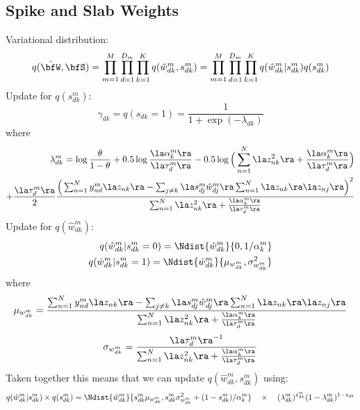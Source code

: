 \documentclass[10pt, a4paper,openany]{report}
\begin{document}
\subsection*{Spike and Slab Weights}
Variational distribution:
\[
q(\hat{\bfW},\bfS) = \prod_{m=1}^{M} \prod_{d=1}^{D_m} \prod_{k=1}^{K} q(\hat{w}_{dk}^m,s_{dk}^m) = \prod_{m=1}^{M} \prod_{d=1}^{D_m} \prod_{k=1}^{K} q(\hat{w}_{dk}^m|s_{dk}^m)q(s_{dk}^m)
\]
Update for $q(s_{dk}^m)$:
\[
\gamma_{dk} = q(s_{dk}=1) = \frac{1}{1+\exp(-\lambda_{dk})}
\]
where
\begin{align*}
\lambda_{dk}^m = \log\frac{\theta}{1-\theta} + 0.5\log\frac{\la\alpha_k^m\ra}{\la\tau_d^m\ra} - 0.5\log\Big( \sum_{n=1}^{N} \la z_{nk}^2 \ra + \frac{\la\alpha_k^m\ra}{\la\tau_d^m\ra} \Big) \\
+ \frac{\la\tau_d^m\ra}{2} \frac{ \Big( \sum_{n=1}^{N} y_{nd}^m \la z_{nk} \ra - \sum_{j \neq k} \la s_{dj}^m\hat{w}_{dj}^m\ra \sum_{n=1}^{N} \la z_{nk} \ra \la z_{nj} \ra \Big)^2} {\sum_{n=1}^{N} \la z_{nk}^2 \ra + \frac{\la\alpha_k^m\ra}{\la\tau_d^m\ra} }
\end{align*}
Update for $q(\hat{w}_{dk}^m)$:
\begin{align*}
q(\hat{w}_{dk}^m|s_{dk}^m=0) = \Ndist{\hat{w}_{dk}^m}{0,1/\alpha_k^m} \\
q(\hat{w}_{dk}^m|s_{dk}^m=1) = \Ndist{\hat{w}_{dk}^m}{\mu_{w_{dk}^m},\sigma_{w_{dk}^m}^2}
\end{align*}
where
\[
\mu_{w_{dk}^m} = \frac{ \sum_{n=1}^{N} y_{nd}^m \la z_{nk} \ra - \sum_{j \neq k} \la s_{dj}^m\hat{w}_{dj}^m \ra \sum_{n=1}^{N} \la z_{nk} \ra \la z_{nj} \ra } { \sum_{n=1}^{N} \la z_{nk}^2 \ra + \frac{\la\alpha_k^m\ra}{\la\tau_d^m\ra} }
\]
\[
\sigma_{w_{dk}^m} = \frac{ \la\tau_d^m\ra^{-1} } { \sum_{n=1}^{N} \la z_{nk}^2 \ra + \frac{\la\alpha_k^m\ra}{\la\tau_d^m\ra} }
\]
Taken together this means that we can update $q(\hat{w}_{dk}^m,s_{dk}^m)$ using:
\[
q(\hat{w}_{dk}^m|s_{dk}^m) \times q(s_{dk}^m) = \Ndist{ \hat{w}_{dk}^m } { s_{dk}^m \mu_{w_{dk}^m}, s_{dk}^m\sigma_{w_{dk}^m}^2 + (1-s_{dk}^m)/\alpha_k^m} \quad \times \quad (\lambda_{dk}^m)^{s_{dk}^m} (1-\lambda_{dk}^m)^{1-s_{dk}}
\]
\end{document}
